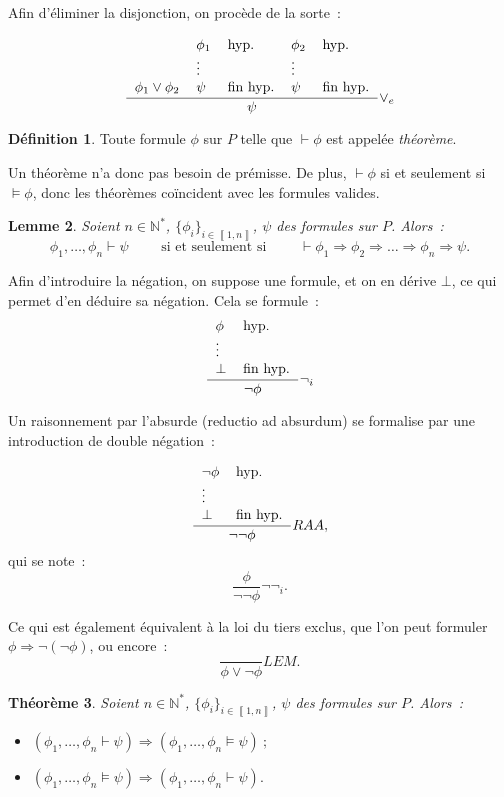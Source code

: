 \documentclass{article}
\newtheorem{thm}{Théorème}[section]
\newtheorem{lem}[thm]{Lemme}
\theoremstyle{definition}
\newtheorem{déf}[thm]{Définition}
\theoremstyle{remark}
\newcommand{\intint}[2]{\left\llbracket#1, #2\right\rrbracket}
\newcommand{\N}{\mathbb N}
\begin{document}
	Afin d'éliminer la disjonction, on procède de la sorte~:

	\[\frac {
		\begin{tabular}{l l l l l}
			& $\phi_1$ & hyp. & $\phi_2$ & hyp. \\
			& \vdots   &       &  \vdots  & \\
			$\phi_1 \lor \phi_2$ & $\psi$ & fin hyp. & $\psi$ & fin hyp.
		\end{tabular}
	}{\psi}\lor_e\]

	\begin{déf} Toute formule $\phi$ sur $P$ telle que $\vdash \phi$ est appelée \textit{théorème}.
	\end{déf}

	Un théorème n'a donc pas besoin de prémisse. De plus, $\vdash \phi$ si et seulement si $\models \phi$, donc les théorèmes coïncident avec les formules valides.

	\begin{lem} Soient $n \in \N^*$, $\{\phi_i\}_{i \in \intint 1n}$, $\psi$ des formules sur $P$. Alors~:
	\[\phi_1, \ldots, \phi_n \vdash \psi \qquad \text{ si et seulement si }
		\qquad \vdash \phi_1 \Rightarrow \phi_2 \Rightarrow \ldots \Rightarrow \phi_n \Rightarrow \psi.\]
	\end{lem}

	Afin d'introduire la négation, on suppose une formule, et on en dérive $\bot$, ce qui permet d'en déduire sa négation. Cela se formule~:
	\[\frac {\begin{tabular}{l l}$\phi$ & hyp. \\ \vdots &\\$\bot$ & fin hyp.\end{tabular}}{\lnot\phi}\lnot_i\]

	Un raisonnement par l'absurde (reductio ad absurdum) se formalise par une introduction de double négation~:

	\[\frac {\begin{tabular}{l l}$\lnot \phi$ & hyp. \\ \vdots &\\ $\bot$ & fin hyp.\end{tabular}}{\lnot\lnot \phi}RAA,\]
	qui se note~:
	\[\frac {\phi}{\lnot\lnot\phi}\lnot\lnot_i.\]

	Ce qui est également équivalent à la loi du tiers exclus, que l'on peut formuler $\phi \Rightarrow \lnot(\lnot\phi)$, ou encore~:
	\[\frac {}{\phi \lor \lnot \phi}LEM.\]

	\begin{thm}Soient $n \in \N^*$, $\{\phi_i\}_{i \in \intint 1n}$, $\psi$ des formules sur $P$. Alors~:
	\begin{itemize}
		\item[(Adéquation)] $\left(\phi_1, \ldots, \phi_n \vdash  \psi\right) \Rightarrow \left(\phi_1, \ldots, \phi_n \models \psi\right)~;$
		\item[(Complétude)] $\left(\phi_1, \ldots, \phi_n \models \psi\right) \Rightarrow \left(\phi_1, \ldots, \phi_n \vdash  \psi\right).$
	\end{itemize}
	\end{thm}
\end{document}

